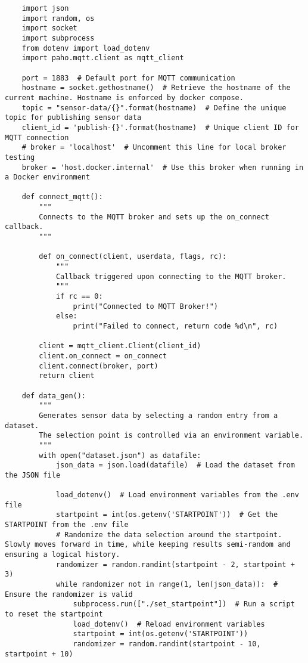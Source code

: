 \begin{verbatim}
    import json
    import random, os
    import socket
    import subprocess
    from dotenv import load_dotenv
    import paho.mqtt.client as mqtt_client

    port = 1883  # Default port for MQTT communication
    hostname = socket.gethostname()  # Retrieve the hostname of the current machine. Hostname is enforced by docker compose.
    topic = "sensor-data/{}".format(hostname)  # Define the unique topic for publishing sensor data
    client_id = 'publish-{}'.format(hostname)  # Unique client ID for MQTT connection
    # broker = 'localhost'  # Uncomment this line for local broker testing
    broker = 'host.docker.internal'  # Use this broker when running in a Docker environment

    def connect_mqtt():
        """
        Connects to the MQTT broker and sets up the on_connect callback.
        """

        def on_connect(client, userdata, flags, rc):
            """
            Callback triggered upon connecting to the MQTT broker.
            """
            if rc == 0:
                print("Connected to MQTT Broker!")
            else: 
                print("Failed to connect, return code %d\n", rc)

        client = mqtt_client.Client(client_id)
        client.on_connect = on_connect 
        client.connect(broker, port)  
        return client  

    def data_gen():
        """
        Generates sensor data by selecting a random entry from a dataset.
        The selection point is controlled via an environment variable.
        """
        with open("dataset.json") as datafile:
            json_data = json.load(datafile)  # Load the dataset from the JSON file
        
            load_dotenv()  # Load environment variables from the .env file
            startpoint = int(os.getenv('STARTPOINT'))  # Get the STARTPOINT from the .env file
            # Randomize the data selection around the startpoint. Slowly moves forward in time, while keeping results semi-random and ensuring a logical history.
            randomizer = random.randint(startpoint - 2, startpoint + 3)
            while randomizer not in range(1, len(json_data)):  # Ensure the randomizer is valid
                subprocess.run(["./set_startpoint"])  # Run a script to reset the startpoint
                load_dotenv()  # Reload environment variables
                startpoint = int(os.getenv('STARTPOINT'))
                randomizer = random.randint(startpoint - 10, startpoint + 10)


\end{verbatim}
